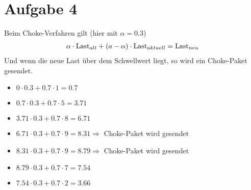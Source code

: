 \documentclass{article}
\begin{document}
	\section*{Aufgabe 4}
	Beim Choke-Verfahren gilt (hier mit $\alpha = 0.3$)
	\begin{align}
		\alpha\cdot \text{Last}_{alt} + (a-\alpha)\cdot\text{Last}_{aktuell} = \text{Last}_{neu} \notag
	\end{align}
	Und wenn die neue Last über dem Schwellwert liegt, so wird ein Choke-Paket gesendet.
	\begin{itemize}
		\item $0\cdot 0.3 + 0.7\cdot 1 = 0.7$
		\item $0.7\cdot 0.3 + 0.7\cdot 5 = 3.71$
		\item $3.71\cdot 0.3 + 0.7\cdot 8 = 6.71$
		\item $6.71\cdot 0.3 + 0.7\cdot 9 = 8.31 \Rightarrow$ Choke-Paket wird gesendet
		\item $8.31\cdot 0.3 + 0.7\cdot 9 = 8.79 \Rightarrow$ Choke-Paket wird gesendet
		\item $8.79\cdot 0.3 + 0.7\cdot 7 = 7.54$
		\item $7.54\cdot 0.3 + 0.7\cdot 2 = 3.66$
	\end{itemize}
	
\end{document}
